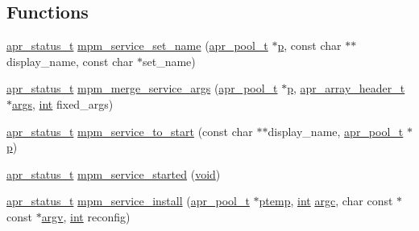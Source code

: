 \subsection*{Functions}
\begin{DoxyCompactItemize}
\item 
\hyperlink{group__apr__errno_gaa5105fa83cc322f09382292db8b47593}{apr\+\_\+status\+\_\+t} \hyperlink{group__APACHE__MPM__WINNT_ga4dc75505b892a87e4c394ed50f17cf49}{mpm\+\_\+service\+\_\+set\+\_\+name} (\hyperlink{structapr__pool__t}{apr\+\_\+pool\+\_\+t} $\ast$\hyperlink{group__APACHE__CORE__MPM_ga5cd91701e5c167f2b1a38e70ab57817e}{p}, const char $\ast$$\ast$display\+\_\+name, const char $\ast$set\+\_\+name)
\item 
\hyperlink{group__apr__errno_gaa5105fa83cc322f09382292db8b47593}{apr\+\_\+status\+\_\+t} \hyperlink{group__APACHE__MPM__WINNT_gafce2daedf93b21c739b60a4bbeb1deee}{mpm\+\_\+merge\+\_\+service\+\_\+args} (\hyperlink{structapr__pool__t}{apr\+\_\+pool\+\_\+t} $\ast$\hyperlink{group__APACHE__CORE__MPM_ga5cd91701e5c167f2b1a38e70ab57817e}{p}, \hyperlink{structapr__array__header__t}{apr\+\_\+array\+\_\+header\+\_\+t} $\ast$\hyperlink{group__APR__Util__DBD_ga6b6dfca544bdc17e0e73e3ca56c2363d}{args}, \hyperlink{pcre_8txt_a42dfa4ff673c82d8efe7144098fbc198}{int} fixed\+\_\+args)
\item 
\hyperlink{group__apr__errno_gaa5105fa83cc322f09382292db8b47593}{apr\+\_\+status\+\_\+t} \hyperlink{group__APACHE__MPM__WINNT_ga2d63009ef027b0ed14a6cbb2755ddb85}{mpm\+\_\+service\+\_\+to\+\_\+start} (const char $\ast$$\ast$display\+\_\+name, \hyperlink{structapr__pool__t}{apr\+\_\+pool\+\_\+t} $\ast$\hyperlink{group__APACHE__CORE__MPM_ga5cd91701e5c167f2b1a38e70ab57817e}{p})
\item 
\hyperlink{group__apr__errno_gaa5105fa83cc322f09382292db8b47593}{apr\+\_\+status\+\_\+t} \hyperlink{group__APACHE__MPM__WINNT_gad80a2108eeead7a47c5f9299b529f8b8}{mpm\+\_\+service\+\_\+started} (\hyperlink{group__MOD__ISAPI_gacd6cdbf73df3d9eed42fa493d9b621a6}{void})
\item 
\hyperlink{group__apr__errno_gaa5105fa83cc322f09382292db8b47593}{apr\+\_\+status\+\_\+t} \hyperlink{group__APACHE__MPM__WINNT_gada58c3d1601bc3f49bfd4b14aad0fda8}{mpm\+\_\+service\+\_\+install} (\hyperlink{structapr__pool__t}{apr\+\_\+pool\+\_\+t} $\ast$\hyperlink{group__APACHE__CORE__CONFIG_ga276c3069e6bb618213a277e21f6f269e}{ptemp}, \hyperlink{pcre_8txt_a42dfa4ff673c82d8efe7144098fbc198}{int} \hyperlink{group__apr__getopt_ga6bdebf9385dc069c90aa21989641be02}{argc}, char const $\ast$const $\ast$\hyperlink{group__apr__getopt_ga675a108e956f4e2ea74dae8d26e6273e}{argv}, \hyperlink{pcre_8txt_a42dfa4ff673c82d8efe7144098fbc198}{int} reconfig)

\end{DoxyCompactItemize}
